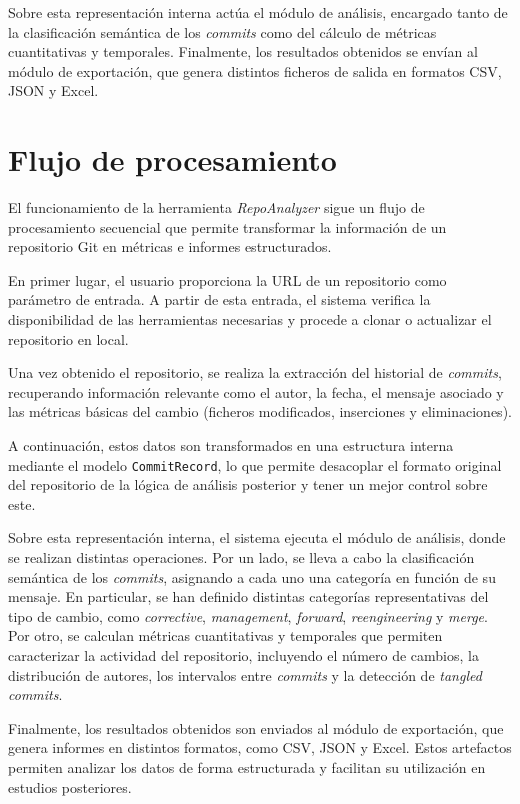 \documentclass[a4paper, 12pt]{book}
\begin{document}
Sobre esta representación interna actúa el módulo de análisis, encargado tanto de la clasificación semántica de los \emph{commits} como del cálculo de métricas cuantitativas y temporales. Finalmente, los resultados obtenidos se envían al módulo de exportación, que genera distintos ficheros de salida en formatos CSV, JSON y Excel.

\section{Flujo de procesamiento}
\label{sec:flujo}

El funcionamiento de la herramienta \emph{RepoAnalyzer} sigue un flujo de procesamiento secuencial que permite transformar la información de un repositorio Git en métricas e informes estructurados.

En primer lugar, el usuario proporciona la URL de un repositorio como parámetro de entrada. A partir de esta entrada, el sistema verifica la disponibilidad de las herramientas necesarias y procede a clonar o actualizar el repositorio en local.

Una vez obtenido el repositorio, se realiza la extracción del historial de \emph{commits}, recuperando información relevante como el autor, la fecha, el mensaje asociado y las métricas básicas del cambio (ficheros modificados, inserciones y eliminaciones).

A continuación, estos datos son transformados en una estructura interna mediante el modelo \texttt{CommitRecord}, lo que permite desacoplar el formato original del repositorio de la lógica de análisis posterior y tener un mejor control sobre este.

Sobre esta representación interna, el sistema ejecuta el módulo de análisis, donde se realizan distintas operaciones. Por un lado, se lleva a cabo la clasificación semántica de los \emph{commits}, asignando a cada uno una categoría en función de su mensaje. En particular, se han definido distintas categorías representativas del tipo de cambio, como \emph{corrective}, \emph{management}, \emph{forward}, \emph{reengineering} y \emph{merge}. Por otro, se calculan métricas cuantitativas y temporales que permiten caracterizar la actividad del repositorio, incluyendo el número de cambios, la distribución de autores, los intervalos entre \emph{commits} y la detección de \emph{tangled commits}.

Finalmente, los resultados obtenidos son enviados al módulo de exportación, que genera informes en distintos formatos, como CSV, JSON y Excel. Estos artefactos permiten analizar los datos de forma estructurada y facilitan su utilización en estudios posteriores.
\end{document}
